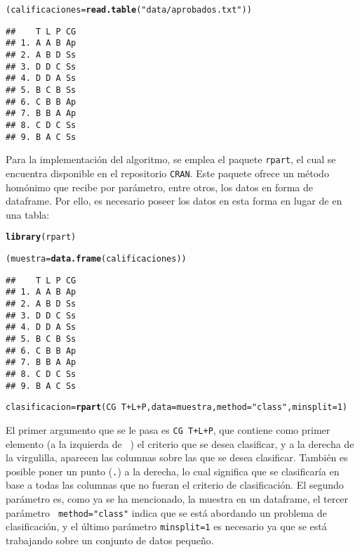 \documentclass[12pt]{report}\usepackage[]{graphicx}\usepackage[dvipsnames]{xcolor}
\makeatletter
\newcommand{\hlnum}[1]{\textcolor[rgb]{0.686,0.059,0.569}{#1}}%
\newcommand{\hlstr}[1]{\textcolor[rgb]{0.192,0.494,0.8}{#1}}%
\newcommand{\hlopt}[1]{\textcolor[rgb]{0,0,0}{#1}}%
\newcommand{\hlstd}[1]{\textcolor[rgb]{0.345,0.345,0.345}{#1}}%
\newcommand{\hlkwb}[1]{\textcolor[rgb]{0.69,0.353,0.396}{#1}}%
\newcommand{\hlkwc}[1]{\textcolor[rgb]{0.333,0.667,0.333}{#1}}%
\newcommand{\hlkwd}[1]{\textcolor[rgb]{0.737,0.353,0.396}{\textbf{#1}}}%
\newenvironment{kframe}{%
 \def\at@end@of@kframe{}%
 \ifinner\ifhmode%
  \def\at@end@of@kframe{\end{minipage}}%
  \begin{minipage}{\columnwidth}%
 \fi\fi%
 \def\FrameCommand##1{\hskip\@totalleftmargin \hskip-\fboxsep
 \colorbox{shadecolor}{##1}\hskip-\fboxsep
     \hskip-\linewidth \hskip-\@totalleftmargin \hskip\columnwidth}%
 \MakeFramed {\advance\hsize-\width
   \@totalleftmargin\z@ \linewidth\hsize
   \@setminipage}}%
 {\par\unskip\endMakeFramed%
 \at@end@of@kframe}
\newenvironment{knitrout}{}{} %
\makeatother
\begin{document}
\begin{knitrout}
\color{fgcolor}\begin{kframe}
\begin{alltt}
\hlstd{(calificaciones}\hlkwb{=}\hlkwd{read.table}\hlstd{(}\hlstr{"data/aprobados.txt"}\hlstd{))}
\end{alltt}
\begin{verbatim}
##    T L P CG
## 1. A A B Ap
## 2. A B D Ss
## 3. D D C Ss
## 4. D D A Ss
## 5. B C B Ss
## 6. C B B Ap
## 7. B B A Ap
## 8. C D C Ss
## 9. B A C Ss
\end{verbatim}
\end{kframe}
\end{knitrout}
	
	Para la implementación del algoritmo, se emplea el paquete \texttt{rpart}, el cual se encuentra disponible en el repositorio \texttt{CRAN}. Este paquete ofrece un método homónimo que recibe por parámetro, entre otros, los datos en forma de dataframe. Por ello, es necesario poseer los datos en esta forma en lugar de en una tabla:
	
\begin{knitrout}
\color{fgcolor}\begin{kframe}
\begin{alltt}
\hlkwd{library}\hlstd{(rpart)}
\end{alltt}


{\ttfamily\noindent\color{warningcolor}{\#\# Warning: package 'rpart' was built under R version 4.3.2}}\begin{alltt}
\hlstd{(muestra}\hlkwb{=}\hlkwd{data.frame}\hlstd{(calificaciones))}
\end{alltt}
\begin{verbatim}
##    T L P CG
## 1. A A B Ap
## 2. A B D Ss
## 3. D D C Ss
## 4. D D A Ss
## 5. B C B Ss
## 6. C B B Ap
## 7. B B A Ap
## 8. C D C Ss
## 9. B A C Ss
\end{verbatim}
\begin{alltt}
\hlstd{clasificacion} \hlkwb{=} \hlkwd{rpart}\hlstd{(CG}\hlopt{~}\hlstd{T}\hlopt{+}\hlstd{L}\hlopt{+}\hlstd{P,} \hlkwc{data}\hlstd{=muestra,} \hlkwc{method}\hlstd{=}\hlstr{"class"}\hlstd{,} \hlkwc{minsplit}\hlstd{=}\hlnum{1}\hlstd{)}
\end{alltt}
\end{kframe}
\end{knitrout}
	
	El primer argumento que se le pasa es \texttt{CG~T+L+P}, que contiene como primer elemento (a la izquierda de \texttt{~}) el criterio que se desea clasificar, y a la derecha de la virgulilla, aparecen las columnas sobre las que se desea clasificar. También es posible poner un punto (\texttt{.}) a la derecha, lo cual significa que se clasificaría en base a todas las columnas que no fueran el criterio de clasificación. El segundo parámetro es, como ya se ha mencionado, la muestra en un dataframe, el tercer parámetro \texttt{ method="class"} indica que se está abordando un problema de clasificación, y el último parámetro \texttt{minsplit=1} es necesario ya que se está trabajando sobre un conjunto de datos pequeño. 
	
\end{document}
